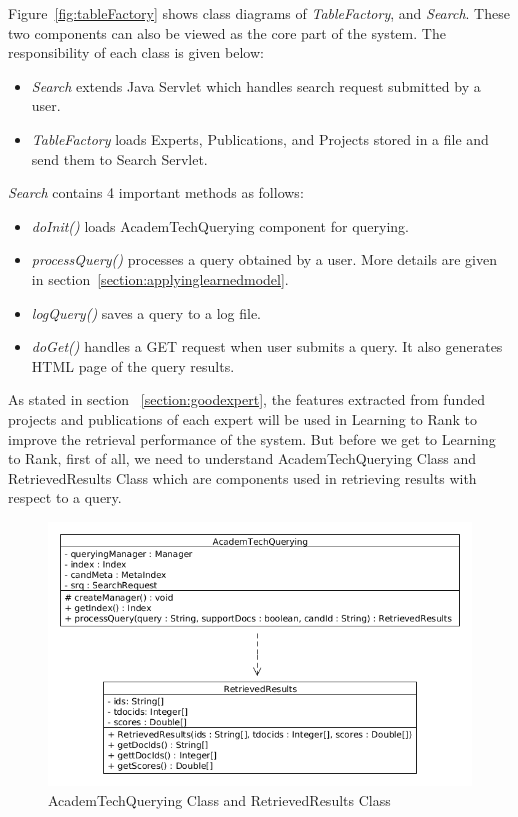 Figure~\ref{fig:tableFactory} shows class diagrams of \textit{TableFactory}, and \textit{Search}. These two components can also be viewed as the core
part of the system. The responsibility of each class is given below:
\begin{itemize}
 \item \textit{Search} extends Java Servlet which handles search request submitted by a user.
 \item \textit{TableFactory} loads Experts, Publications, and Projects stored in a file and send them to Search Servlet.
\end{itemize}

\textit{Search} contains 4 important methods as follows: 
\begin{itemize}
 \item \textit{doInit()} loads AcademTechQuerying component for querying.
 \item \textit{processQuery()} processes a query obtained by a user. More details are given in section~\ref{section:applyinglearnedmodel}.
 \item \textit{logQuery()} saves a query to a log file.
 \item \textit{doGet()} handles a GET request when user submits a query. It also generates HTML page of the query results.
\end{itemize}

As stated in section ~\ref{section:goodexpert}, the features extracted from funded projects and publications of each expert will be used in Learning to Rank
to improve the retrieval performance of the system. But before we get to Learning to Rank, first of all, we need to understand
AcademTechQuerying Class and RetrievedResults Class which are components used in retrieving results with respect to a query. 
\begin{figure}
\centering
\includegraphics[scale=0.3]{./figures/AcademTechQuerying.png}
\caption{AcademTechQuerying Class and RetrievedResults Class} \label{fig:AcademTechQuerying} 
\end{figure}



